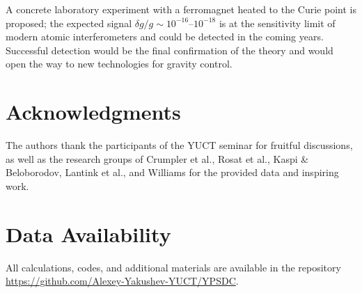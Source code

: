 \documentclass[12pt]{article}
\theoremstyle{remark}
\begin{document}
	A concrete laboratory experiment with a ferromagnet heated to the Curie point is proposed; the expected signal $\delta g/g \sim 10^{-16}$–$10^{-18}$ is at the sensitivity limit of modern atomic interferometers and could be detected in the coming years. Successful detection would be the final confirmation of the theory and would open the way to new technologies for gravity control.
	
	\section*{Acknowledgments}
	The authors thank the participants of the YUCT seminar for fruitful discussions, as well as the research groups of Crumpler et al., Rosat et al., Kaspi \& Beloborodov, Lantink et al., and Williams for the provided data and inspiring work.
	
	\section*{Data Availability}
	All calculations, codes, and additional materials are available in the repository \url{https://github.com/Alexey-Yakushev-YUCT/YPSDC}.
	
\end{document}
